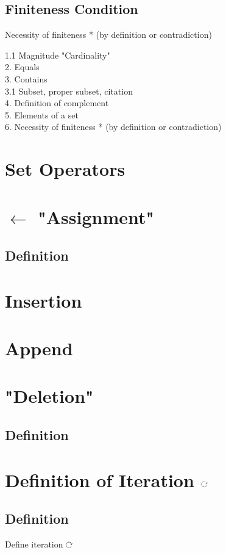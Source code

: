 \documentclass[11pt]{article}
\def \loop {\ensuremath{\rotatebox[origin=c]{-90}{$\circlearrowright$}}}
\begin{document}
\subsection{Finiteness Condition}
 Necessity of finiteness * (by definition or contradiction)

1.1 Magnitude "Cardinality"\\
2. Equals\\
3. Contains\\
3.1 Subset, proper subset, citation\\
4. Definition of complement\\
5. Elements of a set\\
6. Necessity of finiteness * (by definition or contradiction)\\


\section*{Set Operators}
\section{$\leftarrow$ "Assignment"}
\subsection{Definition}

\section{Insertion}

\section{Append}

\section{"Deletion"}
\subsection{Definition}

\section{Definition of Iteration \loop}
\subsection{Definition}
Define iteration \loop
\end{document}
